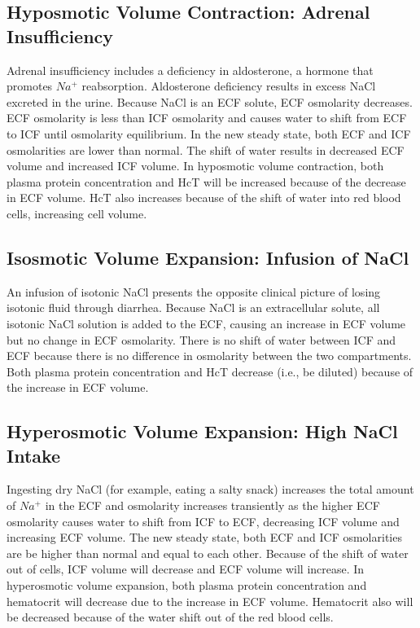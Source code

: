 \subsection{Hyposmotic Volume Contraction: Adrenal Insufficiency}

Adrenal insufficiency includes a deficiency in aldosterone, a hormone that promotes $Na^+$ reabsorption. Aldosterone deficiency results in excess NaCl excreted in the urine. Because NaCl is an ECF solute, ECF osmolarity decreases. ECF osmolarity is less than ICF osmolarity and causes water to shift from ECF to ICF until osmolarity equilibrium. In the new steady state, both ECF and ICF osmolarities are lower than normal. The shift of water results in decreased ECF volume and increased ICF volume. In hyposmotic volume contraction, both plasma protein concentration and HcT will be increased because of the decrease in ECF volume. HcT also increases because of the shift of water into red blood cells, increasing cell volume. 

\subsection{Isosmotic Volume Expansion: Infusion of NaCl} 

An infusion of isotonic NaCl presents the opposite clinical picture of losing isotonic fluid through diarrhea. Because NaCl is an extracellular solute, all isotonic NaCl solution is added to the ECF, causing an increase in ECF volume but no change in ECF osmolarity. There is no shift of water between ICF and ECF because there is no difference in osmolarity between the two compartments. Both plasma protein concentration and HcT decrease (i.e., be diluted) because of the increase in ECF volume. 

\subsection{Hyperosmotic Volume Expansion: High NaCl Intake} 

Ingesting dry NaCl (for example, eating a salty snack) increases the total amount of $Na^+$ in the ECF and osmolarity increases transiently as the higher ECF osmolarity causes water to shift from ICF to ECF, decreasing ICF volume and increasing ECF volume. The new steady state, both ECF and ICF osmolarities are be higher than normal and equal to each other. Because of the shift of water out of cells, ICF volume will decrease and ECF volume will increase. In hyperosmotic volume expansion, both plasma protein concentration and hematocrit will decrease due to the increase in ECF volume. Hematocrit also will be decreased because of the water shift out of the red blood cells. 

